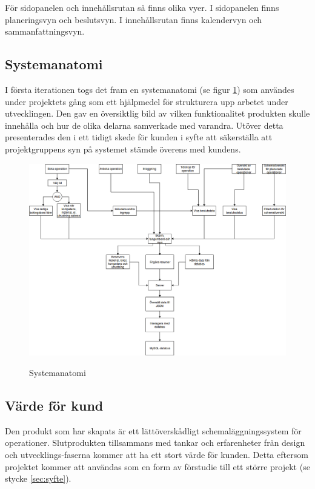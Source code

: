 För sidopanelen och innehållsrutan så finns olika vyer.
I sidopanelen finns planeringsvyn och beslutsvyn. I innehållsrutan finns kalendervyn och sammanfattningsvyn.  

\subsection{Systemanatomi}
I första iterationen togs det fram en systemanatomi (se figur \ref{fig:Systemanatomi}) som användes under projektets gång som ett hjälpmedel för strukturera upp arbetet under utvecklingen. Den gav en översiktlig bild av vilken funktionalitet produkten skulle innehålla och hur de olika delarna samverkade med varandra. Utöver detta presenterades den i ett tidigt skede för kunden i syfte att säkerställa att projektgruppens syn på systemet stämde överens med kundens.

\begin{figure}[H]
    \includegraphics[width=\textwidth,height=.4\textheight]{Figures/Systemanatomi.png}\\
    \caption{Systemanatomi}
    \label{fig:Systemanatomi}
\end{figure}

\subsection{Värde för kund}
Den produkt som har skapats är ett lättöverskådligt schemaläggningssystem för operationer. Slutprodukten tillsammans med tankar och erfarenheter från design och utvecklings-faserna kommer att ha ett stort värde för kunden. Detta eftersom projektet kommer att användas som en form av förstudie till ett större projekt (se stycke \ref{sec:syfte}).

